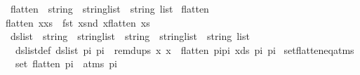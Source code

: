 \begin{isabellebody}
\ flatten\ {\isacharcolon}{\kern0pt}{\isacharcolon}{\kern0pt}\ {\isachardoublequoteopen}{\isacharparenleft}{\kern0pt}string\ {\isasymtimes}\ string{\isacharparenright}{\kern0pt}list\ {\isasymRightarrow}\ string\ list{\isachardoublequoteclose}\ \isanewline
{\isachardoublequoteopen}flatten\ {\isacharbrackleft}{\kern0pt}{\isacharbrackright}{\kern0pt}\ \ \ \ \ {\isacharequal}{\kern0pt}\ {\isacharbrackleft}{\kern0pt}{\isacharbrackright}{\kern0pt}{\isachardoublequoteclose}\ {\isacharbar}{\kern0pt}\isanewline
{\isachardoublequoteopen}flatten\ {\isacharparenleft}{\kern0pt}x{\isacharhash}{\kern0pt}xs{\isacharparenright}{\kern0pt}\ {\isacharequal}{\kern0pt}\ {\isacharparenleft}{\kern0pt}fst\ x{\isacharparenright}{\kern0pt}{\isacharhash}{\kern0pt}{\isacharparenleft}{\kern0pt}snd\ x{\isacharparenright}{\kern0pt}{\isacharhash}{\kern0pt}{\isacharparenleft}{\kern0pt}flatten\ xs{\isacharparenright}{\kern0pt}{\isachardoublequoteclose}\isanewline
\isanewline
{}\isamarkupfalse%
\ ds{\isacharunderscore}{\kern0pt}list\ {\isacharcolon}{\kern0pt}{\isacharcolon}{\kern0pt}\ {\isachardoublequoteopen}{\isacharparenleft}{\kern0pt}string\ {\isasymtimes}\ string{\isacharparenright}{\kern0pt}list\ {\isasymRightarrow}\ {\isacharparenleft}{\kern0pt}string\ {\isasymtimes}\ string{\isacharparenright}{\kern0pt}list\ {\isasymRightarrow}\ string\ list{\isachardoublequoteclose}\ \isanewline
\ \ ds{\isacharunderscore}{\kern0pt}list{\isacharunderscore}{\kern0pt}def{\isacharcolon}{\kern0pt}\ {\isachardoublequoteopen}ds{\isacharunderscore}{\kern0pt}list\ pi{}\ pi{}\ {\isasymequiv}\ remdups\ {\isacharparenleft}{\kern0pt}{\isacharbrackleft}{\kern0pt}x{\isachardot}{\kern0pt}\ x\ {\isacharless}{\kern0pt}{\isacharminus}{\kern0pt}\ {\isacharparenleft}{\kern0pt}flatten\ {\isacharparenleft}{\kern0pt}pi{}{\isacharat}{\kern0pt}pi{}{\isacharparenright}{\kern0pt}{\isacharparenright}{\kern0pt}{\isacharcomma}{\kern0pt}\ x{\isasymin}ds\ pi{}\ pi{}{\isacharbrackright}{\kern0pt}{\isacharparenright}{\kern0pt}{\isachardoublequoteclose}\isanewline
\isanewline
\isanewline
{}\isamarkupfalse%
\ set{\isacharunderscore}{\kern0pt}flatten{\isacharunderscore}{\kern0pt}eq{\isacharunderscore}{\kern0pt}atms{\isacharcolon}{\kern0pt}\ \isanewline
\ \ {\isachardoublequoteopen}set\ {\isacharparenleft}{\kern0pt}flatten\ pi{\isacharparenright}{\kern0pt}\ {\isacharequal}{\kern0pt}\ atms\ pi{\isachardoublequoteclose}\isanewline
%
\isadelimproof
\ \ %
\endisadelimproof
%
\isatagproof
{}\isamarkupfalse%

\end{isabellebody}
